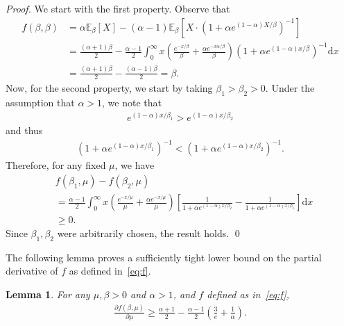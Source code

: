 \documentclass[runningheads]{llncs}
\newcommand{\diff}{\mathrm{d}}
\newtheorem{lem}[theorem]{Lemma}
\begin{document}
\begin{subappendices}
\begin{proof}
  We start with the first property.
  Observe that
  \begin{align*}
    f(\beta, \beta)
    &= \alpha \mathbb{E}_\beta[X] - (\alpha
      -1)\mathbb{E}_\beta[X \cdot (1+\alpha e^{(1-\alpha)X / \beta})^{-1}]
    \\
    &= \frac{(\alpha+1)\beta}{2}-\frac{\alpha -1}{2} \int_0^\infty
x\left(\frac{e^{-x/\beta}}{\beta} + \frac{\alpha e^{-x \alpha
/\beta}}{\beta}\right)(1+\alpha e^{(1-\alpha)x/\beta})^{-1} \diff x
    \\
    &= \frac{(\alpha+1)\beta}{2} - \frac{(\alpha - 1)\beta}{2} = \beta.
  \end{align*}
  Now, for the second property, we start by taking $\beta_1 > \beta_2 >0$.
  Under the assumption that $\alpha > 1$, we note that
  \begin{align*}
    e^{(1-\alpha)x/\beta_1} > e^{(1-\alpha)x/\beta_2}
  \end{align*}
  and thus
  \begin{align*}
    (1+\alpha e^{(1-\alpha)x/\beta_1})^{-1} <
    (1+\alpha e^{(1-\alpha)x/\beta_2})^{-1}.
  \end{align*}
Therefore, for any fixed $\mu$, we have
\begin{align*}
  &f(\beta_1, \mu) - f(\beta_2, \mu)
  \\
  &
    = \frac{\alpha-1}{2}
    \int_0^\infty x\left( \frac{e^{-x/\mu}}{\mu} + \frac{\alpha e^{-x/\mu}}{\mu}\right)
    \left[ \frac{1}{1+\alpha e^{(1-\alpha)x/\beta_2}} - \frac{1}{1+\alpha
    e^{(1-\alpha)x/\beta_1}}\right] \diff x\\
  &\geq 0.
\end{align*}
    Since $\beta_1, \beta_2$ were arbitrarily chosen, the result holds.
    \qed
\end{proof}
The following lemma proves a sufficiently tight lower bound on the partial derivative of
$f$ as defined in~\eqref{eq:f}.
\begin{lem}\label{lem:partial_deriv}
  For any $\mu, \beta>0$ and $\alpha >1$, and $f$ defined as in~\ref{eq:f},
  \begin{align*}
    \frac{\partial f(\beta,\mu)}{\partial \mu} \geq \frac{\alpha+1}{2} -
    \frac{\alpha-1}{2}\left(\frac{3}{e} + \frac{1}{\alpha} \right).
  \end{align*}
\end{lem}


\end{subappendices}
\end{document}

